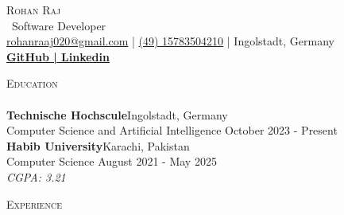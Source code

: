 \documentclass[a4paper]{article}
\newcommand{\lineunder} {
    \vspace*{-8pt} \\
    \hspace*{-18pt} \hrulefill \\
}
\newcommand{\header} [1] {
    {\hspace*{-18pt}\vspace*{6pt} \textsc{#1}}
    \vspace*{-6pt} \lineunder
}
\begin{document}
    \vspace*{-40pt}

    

%
%
  \vspace*{-2pt}
  \begin{center}
    {\Huge \scshape {Rohan Raj}}\\
    \vspace*{2pt}
    \ {Software Developer}\\
    \vspace*{2pt}
    \href{mailto:rohanraaj020@gmail.com}{rohanraaj020@gmail.com} | \href{tel:(49) 15783504210}{(49) 15783504210} | Ingolstadt, Germany\\
    \vspace*{2pt}
    \textbf{\href{https://github.com/rohanraaj2}{GitHub | }}\textbf{\href{https://www.linkedin.com/in/rohanraaj2}{Linkedin}}\\
  \end{center}



      \header{Education}
      \vspace{2mm}
      \textbf{Technische Hochscule}\hfill Ingolstadt, Germany\\
Computer Science and Artificial Intelligence \hfill October 2023 - Present\\

\vspace{2mm}
      \textbf{Habib University}\hfill Karachi, Pakistan\\
Computer Science \hfill August 2021 - May 2025\\
{\sl CGPA: 3.21}\\
\vspace{2mm}

      \header{Experience}
      \vspace{2mm}
\end{document}
